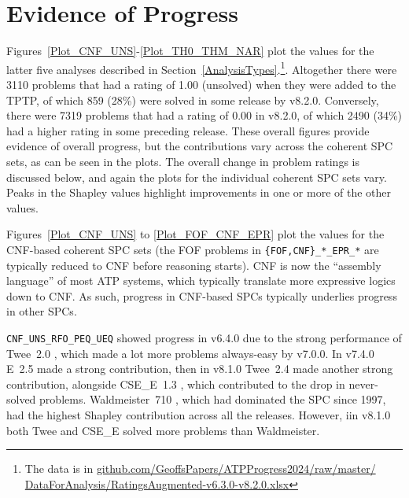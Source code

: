 \documentclass[runningheads]{llncs}
\begin{document}
\section{Evidence of Progress}
\label{Evidence}

Figures~\ref{Plot_CNF_UNS}-\ref{Plot_TH0_THM_NAR} plot the values for the latter five analyses
described in Section~\ref{AnalysisTypes}.\footnote{%
The data is in \href{https://github.com/GeoffsPapers/ATPProgress2024/raw/master/DataForAnalysis/RatingsNoMissing-v6.3.0-v8.2.0.xlsx}{github.com/GeoffsPapers/ATPProgress2024/raw/master/} 
\href{https://github.com/GeoffsPapers/ATPProgress2024/raw/master/DataForAnalysis/RatingsAugmented-v6.3.0-v8.2.0.xlsx}{DataForAnalysis/RatingsAugmented-v6.3.0-v8.2.0.xlsx}}.
Altogether there were 3110 problems that had a rating of 1.00 (unsolved) when they were added to
the TPTP, of which 859 (28\%) were solved in some release by v8.2.0. 
Conversely, there were 7319 problems that had a rating of 0.00 in v8.2.0, of which 2490 (34\%) 
had a higher rating in some preceding release.
These overall figures provide evidence of overall progress, but the contributions vary across
the coherent SPC sets, as can be seen in the plots.
The overall change in problem ratings is discussed below, and again the plots for the individual
coherent SPC sets vary.
Peaks in the Shapley values highlight improvements in one or more of the other values.

Figures~\ref{Plot_CNF_UNS} to \ref{Plot_FOF_CNF_EPR} plot the values for the CNF-based coherent 
SPC sets (the FOF problems in {\tt \{FOF,CNF\}\_*\_EPR\_*} are typically reduced to CNF before
reasoning starts).
CNF is now the ``assembly language'' of most ATP systems, which typically translate more
expressive logics down to CNF.
As such, progress in CNF-based SPCs typically underlies progress in other SPCs.

{\tt CNF\_UNS\_RFO\_PEQ\_UEQ} showed progress in v6.4.0 due to the strong performance of
Twee~2.0 \cite{Sma21}, which made a lot more problems always-easy by v7.0.0.
In v7.4.0 E~2.5 made a strong contribution, then in v8.1.0 Twee~2.4 made another strong 
contribution, alongside CSE\_E~1.3 \cite{XL+18}, which contributed to the drop in never-solved
problems.
Waldmeister~710 \cite{LH02}, which had dominated the SPC since 1997, had the highest Shapley 
contribution across all the releases.
However, iin v8.1.0 both Twee and CSE\_E solved more problems than Waldmeister.
 
\end{document}
